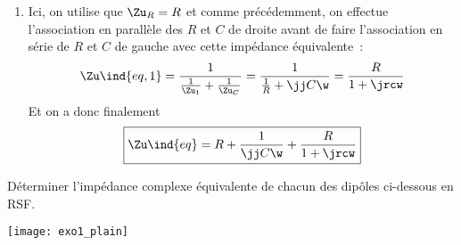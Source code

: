 \documentclass[../TDE6_rsf.tex]{subfiles}%
\begin{document}
{{\begin{answ}
\begin{enumerate}
				\item Ici, on utilise que $\Zu_R = R$ et comme précédemment, on effectue
				      l'association en parallèle des $R$ et $C$ de droite avant de faire
				      l'association en série de $R$ et $C$ de gauche avec cette impédance
				      équivalente~:
				      \begin{gather*}
					      \Zu\ind{eq, 1}
					      = \frac{1}{\frac{1}{\Zu_1} + \frac{1}{\Zu_C}}
					      = \frac{1}{\frac{1}{R} + \jj C\w}
					      = \frac{R}{1 + \jrcw}
				      \end{gather*}
				      Et on a donc finalement
				      \begin{gather*}
					      \boxed{
						      \Zu\ind{eq} = R + \frac{1}{\jj C\w} + \frac{R}{1 + \jrcw}}
				      \end{gather*}
			\end{enumerate}
		\end{answ}%
	}{ %
		Déterminer l'impédance complexe équivalente de chacun des dipôles ci-dessous
		en RSF.
		\begin{center}
			\texttt{[image: exo1\_plain]}
		\end{center}
	}
}
\end{document}
